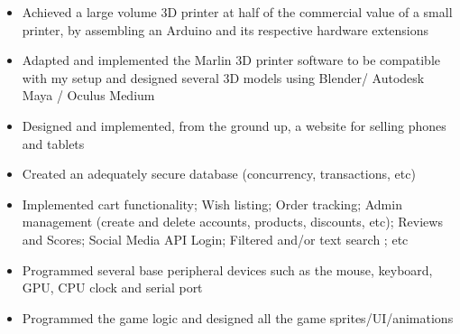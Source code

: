 \documentclass[10pt,a4paper]{altacv}
\begin{document}
\begin{itemize}
    \item Achieved a large volume 3D printer at half of the commercial value of a small printer, by assembling an Arduino and its respective hardware extensions
    \item Adapted and implemented the Marlin 3D printer software to be compatible with my setup and designed several 3D models using Blender/ Autodesk Maya / Oculus Medium
\end{itemize}

\vspace{2mm}

\begin{itemize}
    \item Designed and implemented, from the ground up, a website for selling phones and tablets
    \item Created an adequately secure database (concurrency, transactions, etc)
    \item Implemented cart functionality; Wish listing; Order tracking; Admin management (create and delete accounts, products, discounts, etc); Reviews and Scores; Social Media API Login; Filtered and/or text search ; etc
\end{itemize}

\vspace{2mm}

\begin{itemize}
    \item Programmed several base peripheral devices such as the mouse, keyboard, GPU, CPU clock and serial port
    \item Programmed the game logic and designed all the game sprites/UI/animations 
\end{itemize}

\clearpage


\end{document}
